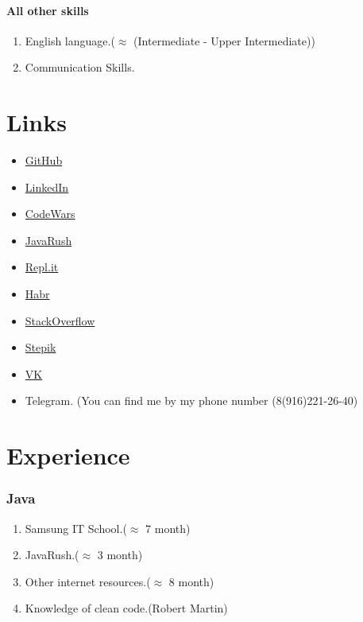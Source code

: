 \documentclass[a4paper, 12pt]{article}
\begin{document}
	\subsection*{All other skills}
	\begin{enumerate}
		\item English language.($\approx$ (Intermediate\cite{b1} - Upper Intermediate\cite{b2}))
		\item Communication Skills.\cite{team}
	\end{enumerate}

	\part{Links}
	\bf
	\begin{itemize}
		\item \href{https://github.com/AndreyVAAVA}{GitHub}
		\item \href{https://www.linkedin.com/in/andre-volkov-v/}{LinkedIn}
		\item \href{https://www.codewars.com/users/AndreyVAAVA}{CodeWars}
		\item \href{https://javarush.ru/users/2482341}{JavaRush}
		\item \href{https://repl.it/@AndrewVolkov}{Repl.it}
		\item \href{https://habr.com/ru/users/andreyder/}{Habr}
		\item \href{https://stackoverflow.com/users/14551339/the-worst}{StackOverflow}
		\item \href{https://stepik.org/users/308680720}{Stepik}
		\item \href{https://vk.com/andrey_vlk}{VK}
		\item Telegram. (You can find me by my phone number (8(916)221-26-40)
	\end{itemize}
	\rm
	\part{Experience}
	
	\section*{Java}
	\begin{enumerate}
		\item Samsung IT School.($\approx$ 7 month)
		\item JavaRush.($\approx$ 3 month)
		\item Other internet resources.($\approx$ 8 month)
		\item Knowledge of clean code.(Robert Martin)
	\end{enumerate}
\end{document}
